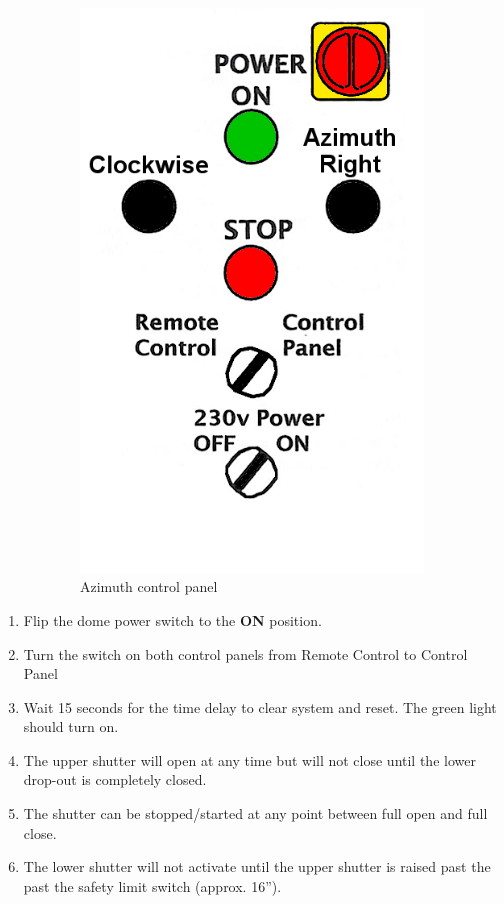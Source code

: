 \documentclass[12pt,titlepage]{article}
\begin{document}
\begin{figure}[H]
\begin{subfigure}[t]{0.4\textwidth}
        \centering
        \includegraphics[width=.9\textwidth]{./images/dome/azimuth_ctrl_panel.png}
        \caption{Azimuth control panel}
    \end{subfigure}
    \caption{}
\end{figure}

\begin{enumerate}
	\item Flip the dome power switch to the \textbf{ON} position.
	\item Turn the switch on both control panels from Remote Control to Control Panel
	\item Wait 15 seconds for the time delay to clear system and reset. The green light should turn on.
	\item The upper shutter will open at any time but will not close until the lower drop-out is completely closed.
	\item The shutter can be stopped/started at any point between full open and full close.
	\item The lower shutter will not activate until the upper shutter is raised past the past the safety limit switch (approx. 16'').
\end{enumerate}
\end{document}
